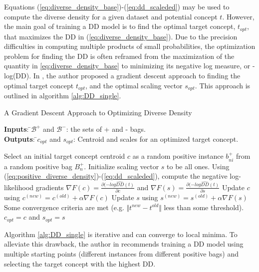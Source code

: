 \documentclass[12pt,dvips]{report}
\numberwithin{equation}{section}
\begin{document}
Equations (\ref{eq:diverse_density_base})-(\ref{eq:dd_scaleded}) may be used to compute the diverse density for a given dataset and potential concept $t$. However, the main goal of training a DD model is to find the optimal target concept, $t_{opt}$, that maximizes the DD in (\ref{eq:diverse_density_base}). Due to the precision difficulties in computing multiple products of small probabilities, the optimization problem for finding the DD is often reframed from the maximization of the quantity in \ref{eq:diverse_density_base} to minimizing its negative log measure, or -log(DD).   In \cite{maro98}, the author proposed a gradient descent approach to finding the optimal target concept $t_{opt}$, and the optimal scaling vector $s_{opt}$.  This approach is outlined in algorithm \ref{alg:DD_single}. %

\begin{algorithm}
  \caption{A Gradient Descent Approach to Optimizing Diverse Density}
  \label{alg:DD_single}
  {\begin{tabbing}
  \textbf{Inputs}: \=$\mathcal{B}^+$ and $\mathcal{B}^-$: the sets of + and - bags.\\
   \textbf{Outputs}: \=$c_{opt}$ and $s_{opt}$: Centroid and scales for an optimized target concept.\\
   \end{tabbing}}
  \begin{algorithmic}
    \STATE Select an initial target concept centroid $c$ as a random positive instance $b_{ni}^{+}$ from a random positive bag $B_{n}^{+}$.
    \STATE Initialize scaling vector $s$ to be all ones.
    \REPEAT 
       \STATE Using (\ref{eq:positive_diverse_density})-(\ref{eq:dd_scaleded}), compute the negative log-likelihood gradients $\nabla F(c)=\frac{\partial(-log\widehat{DD}(t)}{\partial c}$
and $\nabla F(s)=\frac{\partial(-log\widehat{DD}(t)}{\partial s}$
       \STATE Update $c$ using $c^{(new)}=c^{(old)}+\alpha\nabla F(c)$ 
       \STATE Update $s$ using $s^{(new)}=s^{(old)}+\alpha\nabla F(s)$
    \UNTIL Some convergence criteria are met (e.g. $\Vert t^{new}-t^{old}\Vert$ less than some threshold).
    \RETURN $c_{opt}=c$ and $s_{opt}=s$
  \end{algorithmic}
\end{algorithm}

Algorithm \ref{alg:DD_single} is iterative and can converge to local minima. To alleviate this drawback, the author in \cite{maro98} recommends training a DD model using multiple starting points (different instances from different positive bags) and selecting the target concept with the highest DD.
\end{document}

